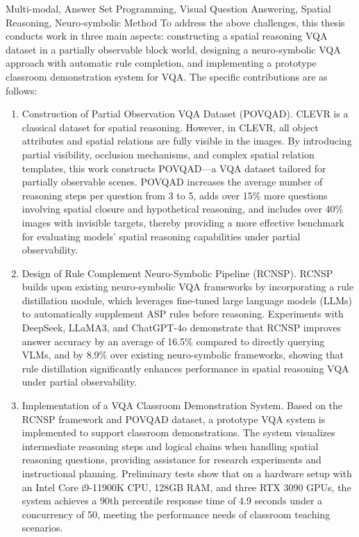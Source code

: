 \begin{englishabstract}{Multi-modal, Answer Set Programming, Visual Question Answering, Spatial Reasoning, Neuro-symbolic Method}
To address the above challenges, this thesis conducts work in three main aspects: constructing a spatial reasoning VQA dataset in a partially observable block world, designing a neuro-symbolic VQA approach with automatic rule completion, and implementing a prototype classroom demonstration system for VQA. The specific contributions are as follows:
\begin{enumerate}[itemsep=0pt, parsep=0pt]
\item Construction of Partial Observation VQA Dataset (POVQAD).
CLEVR is a classical dataset for spatial reasoning. 
However, in CLEVR, all object attributes and spatial relations are fully visible in the images. 
By introducing partial visibility, occlusion mechanisms, and complex spatial relation templates, this work constructs POVQAD—a VQA dataset tailored for partially observable scenes. 
POVQAD increases the average number of reasoning steps per question from 3 to 5, adds over 15\% more questions involving spatial closure and hypothetical reasoning, and includes over 40\% images with invisible targets, thereby providing a more effective benchmark for evaluating models' spatial reasoning capabilities under partial observability.
\item Design of Rule Complement Neuro-Symbolic Pipeline (RCNSP).
RCNSP builds upon existing neuro-symbolic VQA frameworks by incorporating a rule distillation module, which leverages fine-tuned 
large language models (LLMs) to automatically supplement ASP rules before reasoning. 
Experiments with DeepSeek, LLaMA3, and ChatGPT-4o demonstrate that RCNSP improves answer accuracy by an average of 16.5\% compared to directly querying VLMs, 
and by 8.9\% over existing neuro-symbolic frameworks, 
showing that rule distillation significantly enhances performance in spatial reasoning VQA under partial observability.
\item Implementation of a VQA Classroom Demonstration System. Based on the RCNSP framework and POVQAD dataset, a prototype VQA system is implemented to support classroom demonstrations. The system visualizes intermediate reasoning steps and logical chains when handling spatial reasoning questions, providing assistance for research experiments and instructional planning. Preliminary tests show that on a hardware setup with an Intel Core i9-11900K CPU, 128GB RAM, and three RTX 3090 GPUs, the system achieves a 90th percentile response time of 4.9 seconds under a concurrency of 50, meeting the performance needs of classroom teaching scenarios.
\end{enumerate}
\end{englishabstract}

\tableofcontents
\listofothers
